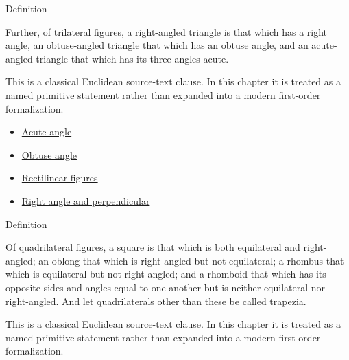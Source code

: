 \begin{definitionbox}{Definition}
\begin{definition}
\label{def:euclid-triangle-angle-classes}
Further, of trilateral figures, a right-angled triangle is that which has a
right angle, an obtuse-angled triangle that which has an obtuse angle, and an
acute-angled triangle that which has its three angles acute.
\end{definition}
\end{definitionbox}
\begin{remark*}
This is a classical Euclidean source-text clause. In this chapter it is treated
as a named primitive statement rather than expanded into a modern first-order
formalization.
\end{remark*}

\begin{lra-not-visible}
\begin{dependencies}
\begin{itemize}
  \item \hyperref[def:euclid-acute-angle]{Acute angle}
  \item \hyperref[def:euclid-obtuse-angle]{Obtuse angle}
  \item \hyperref[def:euclid-rectilinear-figures]{Rectilinear figures}
  \item \hyperref[def:euclid-right-angle-and-perpendicular]{Right angle and perpendicular}
\end{itemize}
\end{dependencies}
\end{lra-not-visible}

\begin{definitionbox}{Definition}
\begin{definition}
\label{def:euclid-quadrilateral-classes}
Of quadrilateral figures, a square is that which is both equilateral and
right-angled; an oblong that which is right-angled but not equilateral; a
rhombus that which is equilateral but not right-angled; and a rhomboid that
which has its opposite sides and angles equal to one another but is neither
equilateral nor right-angled. And let quadrilaterals other than these be called
trapezia.
\end{definition}
\end{definitionbox}
\begin{remark*}
This is a classical Euclidean source-text clause. In this chapter it is treated
as a named primitive statement rather than expanded into a modern first-order
formalization.
\end{remark*}

